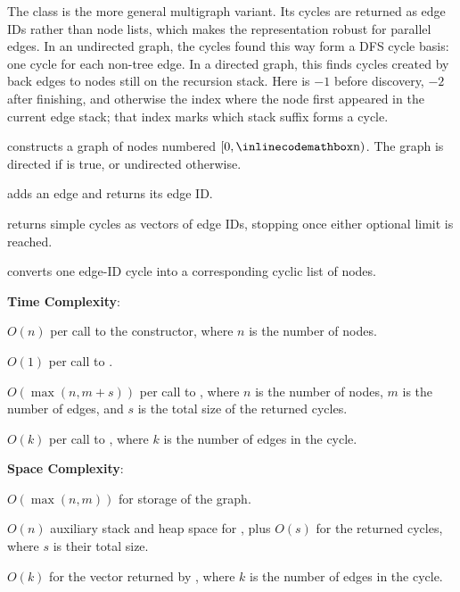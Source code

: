 The  class is the more general multigraph variant. Its cycles are returned as edge IDs rather than node lists, which makes the representation robust for parallel edges. In an undirected graph, the cycles found this way form a DFS cycle basis: one cycle for each non-tree edge. In a directed graph, this finds cycles created by back edges to nodes still on the recursion stack. Here  is $-1$ before discovery, $-2$ after finishing, and otherwise the index where the node first appeared in the current edge stack; that index marks which stack suffix forms a cycle.

\begin{compactitem}
  \item {} constructs a graph of  nodes numbered $[0, {\inlinecodemath{n}})$. The graph is directed if  is true, or undirected otherwise.
  \item {} adds an edge and returns its edge ID.
  \item {} returns simple cycles as vectors of edge IDs, stopping once either optional limit is reached.
  \item {} converts one edge-ID cycle into a corresponding cyclic list of nodes.
\end{compactitem}

\textbf{Time Complexity}:
\begin{compactitem}
  \item $O(n)$ per call to the constructor, where $n$ is the number of nodes.
  \item $O(1)$ per call to .
  \item $O(\max\left(n, m + s\right))$ per call to , where $n$ is the number of nodes, $m$ is the number of edges, and $s$ is the total size of the returned cycles.
  \item $O(k)$ per call to , where $k$ is the number of edges in the cycle.
\end{compactitem}

\textbf{Space Complexity}:
\begin{compactitem}
  \item $O(\max\left(n, m\right))$ for storage of the graph.
  \item $O(n)$ auxiliary stack and heap space for , plus $O(s)$ for the returned cycles, where $s$ is their total size.
  \item $O(k)$ for the vector returned by , where $k$ is the number of edges in the cycle.
\end{compactitem}

